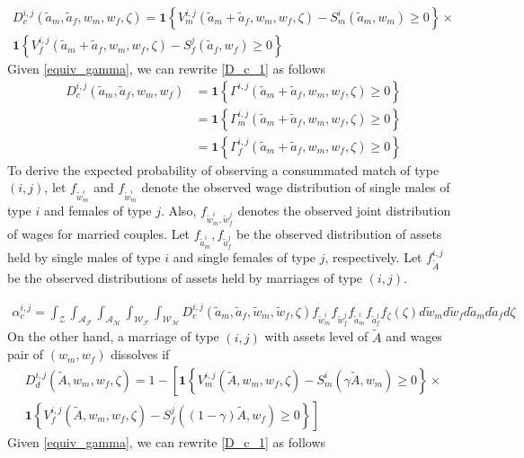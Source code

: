 \begin{align}
D_c^{i,j}(\tilde a_m, \tilde a_f, w_m, w_f, \zeta) = \mathbf 1\left \{V_m^{i,j}(\tilde a_m+\tilde a_f, w_m, w_f, \zeta) - S_m^i(\tilde a_m, w_m) \geq 0 \right \} \times \label{D_c_1} \\
\mathbf 1\left \{V_f^{i,j}(\tilde a_m+\tilde a_f, w_m, w_f, \zeta) - S_f^j(\tilde a_f, w_f) \geq 0 \right  \} \nonumber
\end{align}
Given \eqref{equiv_gamma}, we can rewrite \eqref{D_c_1} as follows 
\begin{align}
D_c^{i,j}(\tilde a_m, \tilde a_f, w_m, w_f) &= \mathbf 1\left \{ \Gamma^{i,j}(\tilde a_m+\tilde a_f, w_m, w_f, \zeta) \geq 0\right \}  \label{D_c_2} \\
&= \mathbf 1\left \{ \Gamma_m^{i,j}(\tilde a_m+\tilde a_f,  w_m, w_f, \zeta) \geq 0\right \}  \nonumber \\
&= \mathbf 1\left \{ \Gamma_f^{i,j}(\tilde a_m+\tilde a_f, w_m, w_f, \zeta) \geq 0\right \}  \nonumber 
\end{align}
To derive the expected probability of observing a consummated match of type $(i,j)$, let $f_{\tilde w^i_m}$ and $f_{\tilde w^i_m}$ denote the observed wage distribution of single males of type $i$ and females of type $j$. Also, $f_{\tilde w^i_m, \tilde w^j_f}$ denotes the observed joint distribution of wages for married couples. Let $f_{\tilde a_m^i},  f_{\tilde a_f^j}$ be the observed distribution of assets held by single males of type $i$ and single females of type $j$, respectively. Let $f_{\tilde A}^{i,j}$ be the observed distributions of assets held by marriages of type $(i,j)$.

\begin{align*}
\alpha_c^{i,j} =\int_{\mathcal{Z}} \int_{\mathcal{A_F}}\int_{\mathcal{A_M}} \int_{\mathcal{W_F}} \int_{\mathcal{W_M}} D_c^{i,j}(\tilde a_m, \tilde a_f, \tilde w_m, \tilde w_f, \zeta) f_{\tilde w^i_m} f_{\tilde w^j_f} f_{\tilde a_m^i} f_{\tilde a_f^j} f_{\zeta}(\zeta) d \tilde w_m d\tilde w_f d \tilde a_m d \tilde a_f d\zeta
\end{align*}
On the other hand, a marriage of type $(i,j)$ with assets level of $\tilde A$ and wages pair of $(w_m, w_f)$ dissolves if 
\begin{align}
D_d^{i,j}(\tilde A, w_m, w_f, \zeta) = 1 - \left [ \mathbf 1\left \{V_m^{i,j}(\tilde A, w_m, w_f, \zeta) - S_m^i(\gamma \tilde A, w_m) \geq 0 \right \} \times \right.  \label{D_d_1}\\
\left. \mathbf 1\left \{V_f^{i,j}(\tilde A, w_m, w_f, \zeta) - S_f^j((1 - \gamma)\tilde A, w_f) \geq 0 \right \} \right] \nonumber 
\end{align}
Given \eqref{equiv_gamma}, we can rewrite \eqref{D_c_1} as follows 

